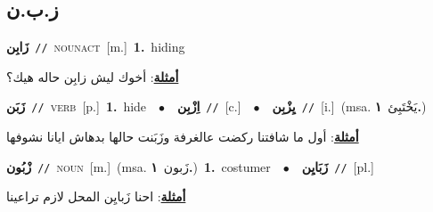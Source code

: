 \documentclass[10pt,a4paper,twoside]{article} %
\begin{document}
\begin{multicols}{2}
\vspace{-3mm}
\subsection*{\color{blue}\foreignlanguage{arabic}{ز.ب.ن}\color{blue}{}} 

{\setlength\topsep{0pt}\textbf{\foreignlanguage{arabic}{زَابِن}}\ {\color{gray}\texttt{//}\color{black}}\ \textsc{noun\textunderscore act}\ [m.]\ \textbf{1.}~hiding\  \begin{flushright}\color{gray}\foreignlanguage{arabic}{\textbf{\underline{\foreignlanguage{arabic}{أمثلة}}}: أخوك ليش زابِن حاله هيك؟}\end{flushright}\color{black}} \vspace{2mm}

{\setlength\topsep{0pt}\textbf{\foreignlanguage{arabic}{زَبَن}}\ {\color{gray}\texttt{//}\color{black}}\ \textsc{verb}\ [p.]\ \textbf{1.}~hide\ \ $\bullet$\ \ \setlength\topsep{0pt}\textbf{\foreignlanguage{arabic}{اِزْبِن}}\ {\color{gray}\texttt{//}\color{black}}\ [c.]\ \ $\bullet$\ \ \setlength\topsep{0pt}\textbf{\foreignlanguage{arabic}{يِزْبِن}}\ {\color{gray}\texttt{//}\color{black}}\ [i.]\ \color{gray}(msa. \foreignlanguage{arabic}{يَخْتَبِئ}~\foreignlanguage{arabic}{\textbf{١.}})\color{black}\  \begin{flushright}\color{gray}\foreignlanguage{arabic}{\textbf{\underline{\foreignlanguage{arabic}{أمثلة}}}: أول ما شافتنا ركضت عالغرفة وزَبَنت حالها بدهاش ايانا نشوفها}\end{flushright}\color{black}} \vspace{2mm}

{\setlength\topsep{0pt}\textbf{\foreignlanguage{arabic}{زْبُون}}\ {\color{gray}\texttt{//}\color{black}}\ \textsc{noun}\ [m.]\ \color{gray}(msa. \foreignlanguage{arabic}{زَبون}~\foreignlanguage{arabic}{\textbf{١.}})\color{black}\ \textbf{1.}~costumer\ \ $\bullet$\ \ \setlength\topsep{0pt}\textbf{\foreignlanguage{arabic}{زَبَايِن}}\ {\color{gray}\texttt{//}\color{black}}\ [pl.]\  \begin{flushright}\color{gray}\foreignlanguage{arabic}{\textbf{\underline{\foreignlanguage{arabic}{أمثلة}}}: احنا زَبايِن المحل لازم تراعينا}\end{flushright}\color{black}} \vspace{2mm}


\end{multicols}
\end{document}

